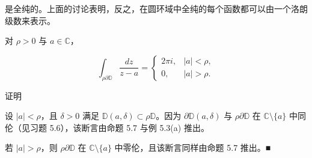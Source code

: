 是全纯的。上面的讨论表明，反之，在圆环域中全纯的每个函数都可以由一个洛朗级数来表示。

\begin{lemma}

对 $ \rho > 0 $ 与 $ a \in \mathbb{C} $，

\begin{equation*}
\int_{\rho\partial\mathbb{D}} \frac{dz}{z - a} = \begin{cases} 2\pi i , & |a| < \rho , \\ 0 , & |a| > \rho . \end{cases}
\end{equation*}

证明

\begin{subitems}
\item

设 $ |a| < \rho $，且 $ \delta > 0 $ 满足 $ \mathbb{D}(a,\delta) \subset \rho\mathbb{D} $。因为 $ \partial\mathbb{D}(a,\delta) $ 与 $ \rho\partial\mathbb{D} $ 在 $ \mathbb{C}\setminus\{a\} $ 中同伦（见习题 5.6），该断言由命题 5.7 与例 5.3(a) 推出。

\item

若 $ |a| > \rho $，则 $ \rho\partial\mathbb{D} $ 在 $ \mathbb{C}\setminus\{a\} $ 中零伦，且该断言同样由命题 5.7 推出。\nobreak\hspace{0.35em}■

\end{subitems}

\end{lemma}

